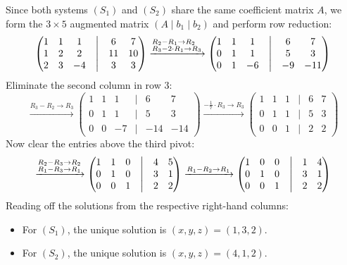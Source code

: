 \begin{exercisesolution*}
\label{sol:simultaneous_row_reduction}
Since both systems $(S_1)$ and $(S_2)$ share the same coefficient matrix $A$, we form the $3 \times 5$ augmented matrix $(A \mid b_1 \mid b_2)$ and perform row reduction:
\[
\begin{pmatrix}
1 & 1 & 1 & \big| & 6 & 7 \\
1 & 2 & 2 & \big| & 11 & 10 \\
2 & 3 & -4 & \big| & 3 & 3
\end{pmatrix}
\xrightarrow{\begin{subarray}{l} R_2 - R_1 \to R_2 \\ R_3 - 2 \cdot R_1 \to R_3 \end{subarray}}
\begin{pmatrix}
1 & 1 & 1 & \big| & 6 & 7 \\
0 & 1 & 1 & \big| & 5 & 3 \\
0 & 1 & -6 & \big| & -9 & -11
\end{pmatrix}
\]
Eliminate the second column in row 3:
\[
\xrightarrow{R_3 - R_2 \to R_3}
\begin{pmatrix}
1 & 1 & 1 & \big| & 6 & 7 \\
0 & 1 & 1 & \big| & 5 & 3 \\
0 & 0 & -7 & \big| & -14 & -14
\end{pmatrix}
\xrightarrow{-\frac{1}{7} \cdot R_3 \to R_3}
\begin{pmatrix}
1 & 1 & 1 & \big| & 6 & 7 \\
0 & 1 & 1 & \big| & 5 & 3 \\
0 & 0 & 1 & \big| & 2 & 2
\end{pmatrix}
\]
Now clear the entries above the third pivot:
\[
\xrightarrow{\begin{subarray}{l} R_2 - R_3 \to R_2 \\ R_1 - R_3 \to R_1 \end{subarray}}
\begin{pmatrix}
1 & 1 & 0 & \big| & 4 & 5 \\
0 & 1 & 0 & \big| & 3 & 1 \\
0 & 0 & 1 & \big| & 2 & 2
\end{pmatrix}
\xrightarrow{R_1 - R_2 \to R_1}
\begin{pmatrix}
1 & 0 & 0 & \big| & 1 & 4 \\
0 & 1 & 0 & \big| & 3 & 1 \\
0 & 0 & 1 & \big| & 2 & 2
\end{pmatrix}
\]
Reading off the solutions from the respective right-hand columns:
\begin{itemize}
    \item For $(S_1)$, the unique solution is $(x, y, z) = (1, 3, 2)$.
    \item For $(S_2)$, the unique solution is $(x, y, z) = (4, 1, 2)$.
\end{itemize}
\end{exercisesolution*}

